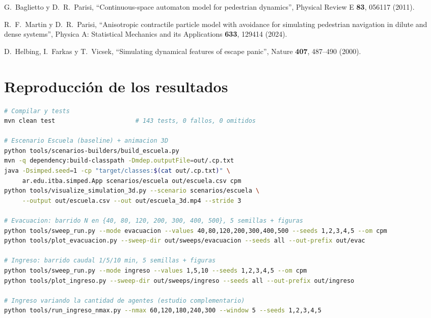 \documentclass[11pt,a4paper]{article}
\begin{document}
\begin{thebibliography}{9}
G.~Baglietto y D.~R.~Parisi,
``Continuous-space automaton model for pedestrian dynamics'',
Physical Review E \textbf{83}, 056117 (2011).

R.~F.~Martin y D.~R.~Parisi,
``Anisotropic contractile particle model with avoidance for simulating
pedestrian navigation in dilute and dense systems'',
Physica A: Statistical Mechanics and its Applications \textbf{633}, 129414 (2024).

D.~Helbing, I.~Farkas y T.~Vicsek,
``Simulating dynamical features of escape panic'',
Nature \textbf{407}, 487--490 (2000).
\end{thebibliography}

\appendix
\section{Reproducción de los resultados}
\label{sec:reproduccion}

\begin{lstlisting}[language=bash]
# Compilar y tests
mvn clean test                      # 143 tests, 0 fallos, 0 omitidos

# Escenario Escuela (baseline) + animacion 3D
python tools/scenarios-builders/build_escuela.py
mvn -q dependency:build-classpath -Dmdep.outputFile=out/.cp.txt
java -Dsimped.seed=1 -cp "target/classes:$(cat out/.cp.txt)" \
     ar.edu.itba.simped.App scenarios/escuela out/escuela.csv cpm
python tools/visualize_simulation_3d.py --scenario scenarios/escuela \
     --output out/escuela.csv --out out/escuela_3d.mp4 --stride 3

# Evacuacion: barrido N en {40, 80, 120, 200, 300, 400, 500}, 5 semillas + figuras
python tools/sweep_run.py --mode evacuacion --values 40,80,120,200,300,400,500 --seeds 1,2,3,4,5 --om cpm
python tools/plot_evacuacion.py --sweep-dir out/sweeps/evacuacion --seeds all --out-prefix out/evac

# Ingreso: barrido caudal 1/5/10 min, 5 semillas + figuras
python tools/sweep_run.py --mode ingreso --values 1,5,10 --seeds 1,2,3,4,5 --om cpm
python tools/plot_ingreso.py --sweep-dir out/sweeps/ingreso --seeds all --out-prefix out/ingreso

# Ingreso variando la cantidad de agentes (estudio complementario)
python tools/run_ingreso_nmax.py --nmax 60,120,180,240,300 --window 5 --seeds 1,2,3,4,5
\end{lstlisting}
\end{document}

